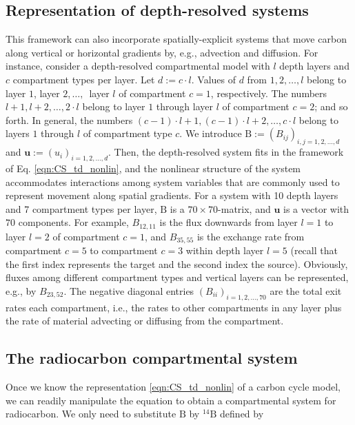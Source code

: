 \documentclass[11pt,a4paper]{article}
\newcommand{\red}[1]{\textcolor{red}{#1}}
\renewcommand{\vec}[1]{\mathbf{#1}}
\newcommand{\tens}[1]{\mathrm{#1}}
\begin{document}
    
\subsection{Representation of depth-resolved systems}
    This framework can also incorporate spatially-explicit systems that move carbon along vertical or horizontal gradients by, e.g., advection and diffusion.  For instance, consider a depth-resolved compartmental model with $l$ depth layers and $c$ compartment types per layer.
    Let $d:=c \cdot l$. %
    Values of $d$ from $1,2, \ldots, l$  belong to layer $1$, layer $2$,$\,\ldots,\,$ layer $l$ of compartment $c =  1$, respectively.
    The numbers $l+1,l+2,\ldots,2 \cdot l$ belong to layer $1$ through layer $l$ of compartment $c = 2$; and so forth.
    In general, the numbers $(c-1) \cdot l+1,(c-1) \cdot l+2,\ldots,c \cdot l$ belong to layers $1$ through $l$ of compartment type $c$.
    We introduce $\tens{B}:=(B_{ij})_{i,j=1,2,\ldots,d}$ and $\vec{u}:=(u_i)_{i=1,2,\ldots,d}$.
    Then, the depth-resolved system fits in the framework of Eq. \eqref{eqn:CS_td_nonlin}, and the nonlinear structure of the system accommodates interactions among system variables that are commonly used to represent movement along spatial gradients.
    For a system with 10 depth layers and 7 compartment types per layer, $\tens{B}$ is a $70\times 70$-matrix, and $\vec{u}$ is a vector with $70$ components.
    For example, $B_{12,11}$ is the flux downwards from layer $l = 1$ to layer $l = 2$ of compartment $c = 1$, and $B_{35,55}$ is the exchange rate from compartment $c = 5$  to compartment $c = 3$ within depth layer $l = 5$ (recall that the first index represents the target and the second index the source).
    Obviously,  fluxes among different compartment types and vertical layers can be represented, e.g., by $B_{23,52}$. 
    The negative diagonal entries $(B_{ii})_{i=1,2,\ldots,70}$ are the total exit rates each compartment, i.e., the rates to other compartments  in any layer plus the rate of material advecting or diffusing from the compartment.
    

\subsection{The radiocarbon compartmental system}
    Once we know the representation \eqref{eqn:CS_td_nonlin} of a carbon cycle model, we can readily manipulate the equation to obtain a compartmental system for radiocarbon.
    We only need to substitute $\tens{B}$ by ${}^{14}\tens{B}$ defined by
    
\end{document}
